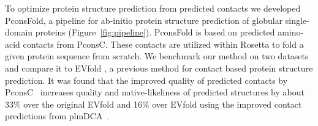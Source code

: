 \documentclass{bioinfo}
\begin{document}
To optimize protein structure prediction from predicted contacts we
developed PconsFold, a pipeline for ab-initio protein structure
prediction of globular single-domain proteins
(Figure~\ref{fig:pipeline}). PconsFold is based on predicted
amino-acid contacts from PconsC. These contacts are utilized within
Rosetta to fold a given protein sequence from scratch. We benchmark
our method on two datasets and compare it to EVfold
\cite[]{marks_protein_2011}, a previous method for contact based
protein structure prediction. It was found that the improved quality of predicted contacts
by PconsC~\cite{skwark_PconsC:_2013} increases quality and
native-likeliness of predicted structures by about 33\% over the
original EVfold and 16\% over EVfold using the improved contact
predictions from plmDCA~\cite{ekeberg_improved_2013}.
\end{document}
